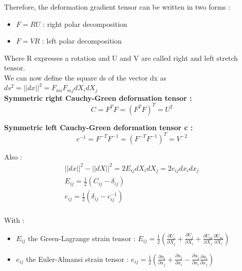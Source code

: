 \documentclass[../main.tex]{subfiles}
\begin{document}
Therefore, the deformation gradient tensor can be written in two forms : \begin{itemize}
    \item $F = RU$ : right polar decomposition\\
    \item $F = VR$ : left polar decomposition\\
\end{itemize}

Where R expresses a rotation and U and V are called right and left stretch tensor.\\

We can now define the square ds of the vector dx as $ds^2 = \lvert \lvert dx\rvert \rvert^2 = F_{mi}F_{mj}dX_idX_j$\\

\textbf{Symmetric right Cauchy-Green deformation tensor :}\begin{equation}
    C = F^TF = (F^TF)^T = U^2
\end{equation}

\textbf{Symmetric left Cauchy-Green deformation tensor c :}\begin{equation}
    c^{-1} = F^{-T}F^{-1} = (F^{-T}F^{-1})^T = V^{-2}
\end{equation}

Also : \begin{equation}
    \begin{gathered}
        \lvert \lvert dx\rvert \rvert^2 - \lvert \lvert dX\rvert \rvert^2 = 2E_{ij} dX_idX_j = 2e_{ij} dx_idx_j\\
        E_{ij} = \frac{1}{2}(C_{ij}-\delta_{ij})\\
        e_{ij} = \frac{1}{2}(\delta_{ij} - c_{ij}^{-1})\\
    \end{gathered}
\end{equation}

With :\begin{itemize}
    \item $E_{ij}$ the Green-Lagrange strain tensor : $E_{ij} = \frac{1}{2}(\frac{\partial U_i}{\partial X_j} + \frac{\partial U_j}{\partial X_i} + \frac{\partial U_m}{\partial X_j}\frac{\partial U_m}{\partial X_i})$\\
    \item $e_{ij}$ the Euler-Almansi strain tensor : $e_{ij} = \frac{1}{2}(\frac{\partial u_i}{\partial x_j} + \frac{\partial u_j}{\partial x_i} - \frac{\partial u_j}{\partial x_i}\frac{\partial u_i}{\partial x_j})$\\
\end{itemize}
\end{document}
